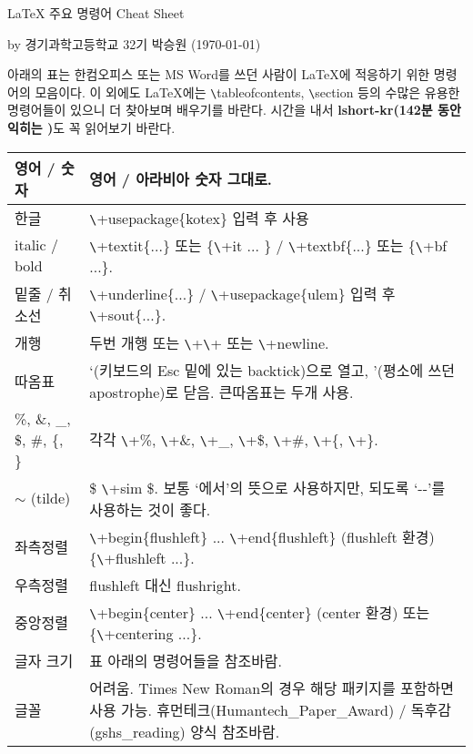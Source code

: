 \documentclass[11pt]{article}
\begin{document}
	\begin{center}
		\Large  \LaTeX{} 주요 명령어 Cheat Sheet
	\end{center}
	\begin{flushright}
		by 경기과학고등학교 32기 박승원 (\today)
	\end{flushright}
	아래의 표는 한컴오피스 또는 MS Word를 쓰던 사람이 \LaTeX 에 적응하기 위한 명령어의 모음이다.
	이 외에도 \LaTeX 에는 \verb+\+tableofcontents, \verb+\+section 등의 수많은 유용한 명령어들이 있으니 더 찾아보며 배우기를 바란다.
	시간을 내서 \textbf{lshort-kr(142분 동안 익히는 \LaTeXe)}도 꼭 읽어보기 바란다.
	
	\renewcommand{\arraystretch}{1.2}
\begin{table}[h]
	\centering
	\begin{tabular}{|p{}|p{}|}
		\hline
		영어 / 숫자 & 영어 / 아라비아 숫자 그대로. \\
		\hline
		한글 & \verb+\+usepackage\{kotex\} 입력 후 사용 \\
		\hline
		italic / bold & \verb+\+textit\{...\} 또는 \{\verb+\+it ... \} / \verb+\+textbf\{...\} 또는 \{\verb+\+bf ...\}. \\
		\hline
		밑줄 / 취소선 & \verb+\+underline\{...\} / \verb+\+usepackage\{ulem\} 입력 후 \verb+\+sout\{...\}. \\
		\hline
		개행 & 두번 개행 또는 \verb+\+\verb+\+ 또는 \verb+\+newline. \\
		\hline
		따옴표 & `(키보드의 Esc 밑에 있는 backtick)으로 열고, '(평소에 쓰던 apostrophe)로 닫음. 큰따옴표는 두개 사용. \\
		\hline
		\%, \&, \_, \$, \#, \{, \} & 각각 \verb+\+\%, \verb+\+\&, \verb+\+\_, \verb+\+\$, \verb+\+\#, \verb+\+\{, \verb+\+\}. \\
		\hline
		$ \sim $ (tilde) & \$ \verb+\+sim \$. 보통 `에서'의 뜻으로 사용하지만, 되도록 `-{}-'를 사용하는 것이 좋다. \\
		\hline
		좌측정렬 & \verb+\+begin\{flushleft\} ... \verb+\+end\{flushleft\} (flushleft 환경) \{\verb+\+flushleft ...\}. \\
		\hline
		우측정렬 & flushleft 대신 flushright. \\
		\hline
		중앙정렬 & \verb+\+begin\{center\} ... \verb+\+end\{center\} (center 환경) 또는 \{\verb+\+centering ...\}. \\
		\hline
		글자 크기 & 표 아래의 명령어들을 참조바람.   \\
		\hline
		글꼴 & 어려움. Times New Roman의 경우 해당 패키지를 포함하면 사용 가능. 휴먼테크(Humantech\_Paper\_Award) / 독후감(gshs\_reading) 양식 참조바람. \\

\end{tabular}
\end{table}
\end{document}
